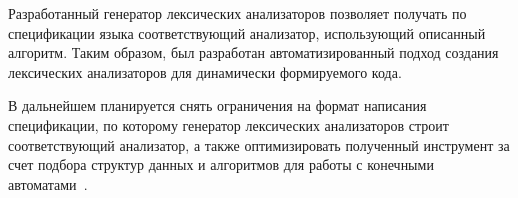 \documentclass[10pt, conference, compsocconf]{IEEEtran}
\begin{document}
Разработанный генератор лексических анализаторов позволяет получать по спецификации языка соответствующий анализатор, использующий описанный алгоритм. Таким образом, был разработан автоматизированный подход создания лексических анализаторов для динамически формируемого кода.

В дальнейшем планируется снять ограничения на формат написания спецификации, по которому генератор лексических анализаторов строит соответствующий анализатор, а также оптимизировать полученный инструмент  за счет подбора структур данных и алгоритмов для работы с конечными автоматами~\cite{AlgoFSA}.






\nocite{*}
\def\BibTeX{BibTeX}


%






\end{document}
